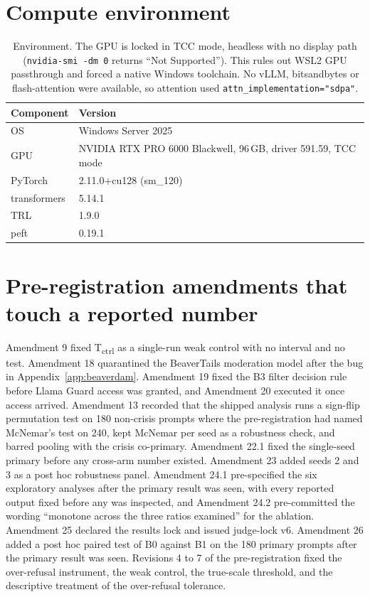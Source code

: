 \documentclass[10pt]{article} %
\newcommand{\Bz}{B0}
\newcommand{\Bo}{B1}
\newcommand{\Bth}{B3}
\newcommand{\Tctrl}{T\textsubscript{ctrl}}
\begin{document}
\section{Compute environment}
\label{app:env}
\begin{table}[H]
\caption{Environment. The GPU is locked in TCC mode, headless with no display path (\texttt{nvidia-smi -dm 0} returns ``Not Supported''). This rules out WSL2 GPU passthrough and forced a native Windows toolchain. No vLLM, bitsandbytes or flash-attention were available, so attention used \texttt{attn\_implementation="sdpa"}.}
\label{tab:env}
\begin{center}
\begin{tabular}{ll}
\toprule
Component & Version \\
\midrule
OS & Windows Server 2025 \\
GPU & NVIDIA RTX PRO 6000 Blackwell, 96\,GB, driver 591.59, TCC mode \\
PyTorch & 2.11.0+cu128 (sm\_120) \\
transformers & 5.14.1 \\
TRL & 1.9.0 \\
peft & 0.19.1 \\
\bottomrule
\end{tabular}
\end{center}
\end{table}

\section{Pre-registration amendments that touch a reported number}
\label{app:amend}
Amendment 9 fixed \Tctrl{} as a single-run weak control with no interval and no test. Amendment 18 quarantined the BeaverTails moderation model after the bug in Appendix~\ref{app:beaverdam}. Amendment 19 fixed the \Bth{} filter decision rule before Llama Guard access was granted, and Amendment 20 executed it once access arrived. Amendment 13 recorded that the shipped analysis runs a sign-flip permutation test on 180 non-crisis prompts where the pre-registration had named McNemar's test on 240, kept McNemar per seed as a robustness check, and barred pooling with the crisis co-primary. Amendment 22.1 fixed the single-seed primary before any cross-arm number existed. Amendment 23 added seeds 2 and 3 as a post hoc robustness panel. Amendment 24.1 pre-specified the six exploratory analyses after the primary result was seen, with every reported output fixed before any was inspected, and Amendment 24.2 pre-committed the wording ``monotone across the three ratios examined'' for the ablation. Amendment 25 declared the results lock and issued judge-lock v6. Amendment 26 added a post hoc paired test of \Bz{} against \Bo{} on the 180 primary prompts after the primary result was seen. Revisions 4 to 7 of the pre-registration fixed the over-refusal instrument, the weak control, the true-scale threshold, and the descriptive treatment of the over-refusal tolerance.
\end{document}
